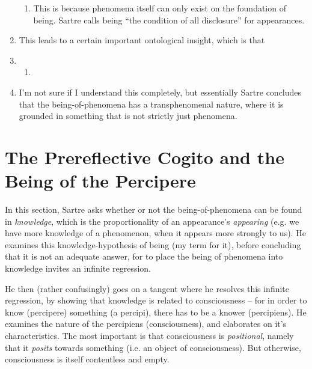 \begin{enumerate}
\begin{enumerate}
    \item This is because phenomena itself can only exist on the foundation of being. Sartre calls being \enquote{the condition of all disclosure} for appearances.
  \end{enumerate}
  \item This leads to a certain important ontological insight, which is that \emph{}
  \item {}
  \begin{enumerate}
    \item {}
  \end{enumerate}
  \item I'm not sure if I understand this completely, but essentially Sartre concludes that the being-of-phenomena has a transphenomenal nature, where it is grounded in something that is not strictly just phenomena.
\end{enumerate}

\section{The Prereflective Cogito and the Being of the Percipere}
In this section, Sartre asks whether or not the being-of-phenomena can be found in \emph{knowledge}, which is the proportionality of an appearance's \emph{appearing} (e.g. we have more knowledge of a phenomenon, when it appears more strongly to us). He examines this knowledge-hypothesis of being (my term for it), before concluding that it is not an adequate answer, for to place the being of phenomena into knowledge invites an infinite regression.

He then (rather confusingly) goes on a tangent where he resolves this infinite regression, by showing that knowledge is related to consciousness -- for in order to know (percipere) something (a percipi), there has to be a knower (percipiens).
He examines the nature of the percipiens (consciousness), and elaborates on it's characteristics. The most important is that consciousness is \emph{positional}, namely that it \emph{posits} towards something (i.e. an object of consciousness). But otherwise, consciousness is itself contentless and empty.


